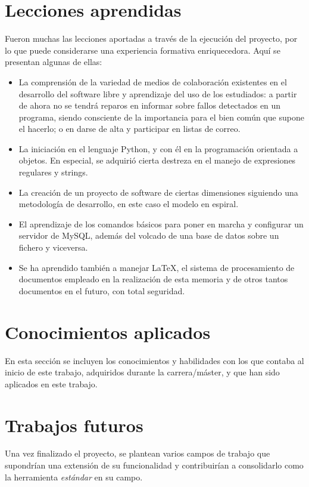\section{Lecciones aprendidas}
Fueron muchas las lecciones aportadas a través de la ejecución del proyecto,
por lo que puede considerarse una experiencia formativa enriquecedora. Aquí
se presentan algunas de ellas:
\begin{itemize}
\item La comprensión de la variedad de medios de colaboración existentes en el
desarrollo del software libre y aprendizaje del uso de los estudiados:
a partir de ahora no se tendrá reparos en informar sobre fallos detectados
en un programa, siendo consciente de la importancia para el bien común que
supone el hacerlo; o en darse de alta y participar en listas de correo.
\item La iniciación en el lenguaje Python, y con él en la programación orientada
a objetos. En especial, se adquirió cierta destreza en el manejo de expresiones
regulares y strings.
\item La creación de un proyecto de software de ciertas dimensiones siguiendo una
metodología de desarrollo, en este caso el modelo en espiral.
\item El aprendizaje de los comandos básicos para poner en marcha y configurar
un servidor de MySQL, además del volcado de una base de datos sobre un fichero
y viceversa.
\item Se ha aprendido también a manejar \LaTeX{}, el sistema de procesamiento
de documentos empleado en la realización de esta memoria y de otros tantos
documentos en el futuro, con total seguridad.
\end{itemize}


\section{Conocimientos aplicados}

En esta sección se incluyen los conocimientos y habilidades con los que contaba
al inicio de este trabajo, adquiridos durante la carrera/máster, y que han sido
aplicados en este trabajo.


\section{Trabajos futuros}
Una vez finalizado el proyecto, se plantean varios campos de trabajo
que supondrían una extensión de su funcionalidad y contribuirían a
consolidarlo como la herramienta \textit{estándar} en su campo.

